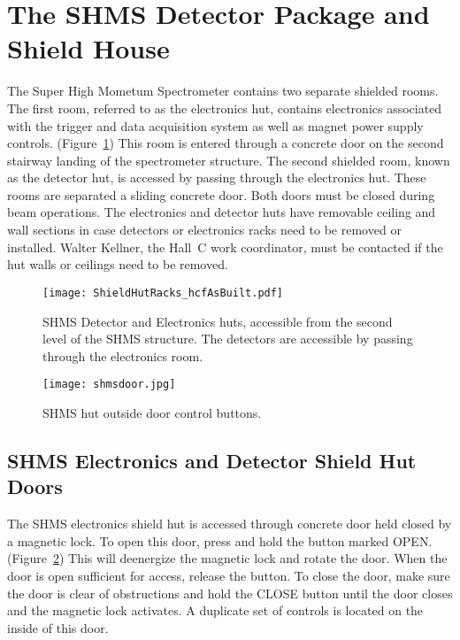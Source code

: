 
\section{The SHMS Detector Package and Shield House }

The Super High Mometum Spectrometer contains two separate shielded
rooms.  The first room, referred to as the electronics hut, contains
electronics associated with the trigger and data acquisition system as
well as magnet power supply controls.
(Figure~\ref{fig:shmshuts})
This room is entered through a concrete
door on the second stairway landing of the spectrometer structure.
The second shielded room, known as the detector hut, is accessed by
passing through the electronics hut.  These rooms are separated a
sliding concrete door.  Both doors must be closed during beam
operations.  The electronics and detector huts have removable ceiling
and wall sections in case detectors or electronics racks need to be
removed or installed.  Walter Kellner, the Hall~C work coordinator,  
must be contacted if the hut walls or ceilings need to be removed.
\begin{figure}
\begin{center}
\texttt{[image: ShieldHutRacks\_hcfAsBuilt.pdf]}
\caption{\label{fig:shmshuts}SHMS Detector and Electronics huts,
  accessible from the second level of the SHMS structure.  The
  detectors are accessible by passing through the electronics room.}
\end{center}
\end{figure}

\begin{figure}
\begin{center}
\texttt{[image: shmsdoor.jpg]}
\caption{\label{fig:shmsdoorcontrol}SHMS hut outside door control buttons.}
\end{center}
\end{figure}

\subsection{SHMS Electronics and Detector Shield Hut Doors}
\label{sec:shmsdoors}
The SHMS electronics shield hut is accessed through concrete door held
closed by a magnetic lock.  To open this door, press and hold the
button marked OPEN.  (Figure~\ref{fig:shmsdoorcontrol})  This will
deenergize the magnetic lock and rotate
the door.  When the door is open sufficient for access, release the
button.  To close the door, make sure the door is clear of
obstructions and hold the CLOSE button until the door closes and the
magnetic lock activates.  A duplicate set of controls is located on
the inside of this door.

